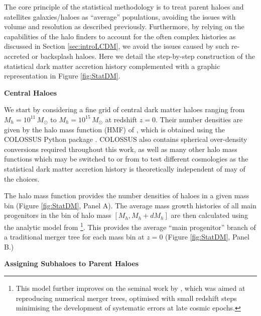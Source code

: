 The core principle of the statistical methodology is to treat parent haloes and satellites galaxies/haloes as ``average'' populations, avoiding the issues with volume and resolution as described previously. 
Furthermore, by relying on the capabilities of the halo finders to account for the often complex histories as discussed in Section \ref{sec:introLCDM}, we avoid the issues caused by such re-accreted or backsplash haloes.
Here we detail the step-by-step construction of the statistical dark matter accretion history complemented with a graphic representation in Figure \ref{fig:StatDM}.

\textbf{Central Haloes}

We start by considering a fine grid of central dark matter haloes ranging from $M_{h}=10^{11}\, M_{\odot}$ to $M_{h}=10^{15}\, M_{\odot}$ at redshift $z=0$. Their number densities are given by the halo mass function (HMF) of \citet{Despali2016TheDefinitions}, which is obtained using the COLOSSUS Python package \citep{Diemer2018COLOSSUS:Halos}. COLOSSUS also contains spherical over-density conversions required throughout this work, as well as many other halo mass functions which may be switched to or from to test different cosmologies as the statistical dark matter accretion history is theoretically independent of may of the choices.

The halo mass function provides the number densities of haloes in a given mass bin (Figure \ref{fig:StatDM}, Panel A).
The average mass growth histories of all main progenitors in the bin of halo mass $[M_{h},M_{h}+dM_{h}]$ are then calculated using the analytic model from \citet{vandenBosch2014ComingWells}\footnote{This model further improves on the seminal work by \citet{Parkinson2008GeneratingTrees}, which was aimed at reproducing numerical merger trees, optimised with small redshift steps minimising the development of systematic errors at late cosmic epochs.}. This provides the average ``main progenitor'' branch of a traditional merger tree for each mass bin at $z = 0$ (Figure \ref{fig:StatDM}, Panel B.)

\textbf{Assigning Subhaloes to Parent Haloes}

